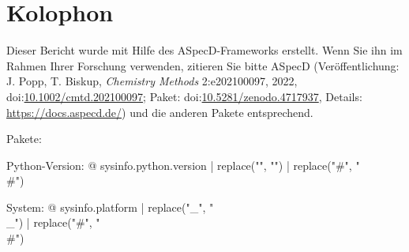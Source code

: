 \section*{Kolophon}

Dieser Bericht wurde mit Hilfe des ASpecD-Frameworks erstellt. Wenn Sie ihn im Rahmen Ihrer Forschung verwenden, zitieren Sie bitte ASpecD (Veröffentlichung: J. Popp, T. Biskup, \emph{Chemistry Methods} 2:e202100097, 2022, doi:\href{https://doi.org/10.1002/cmtd.202100097}{10.1002/cmtd.202100097}; Paket: doi:\href{https://doi.org/10.5281/zenodo.4717937}{10.5281/zenodo.4717937}, Details: \url{https://docs.aspecd.de/}) und die anderen Pakete entsprechend.

Pakete: %


Python-Version: {@ sysinfo.python.version | replace("\n", "") | replace("#", "\\#") }

System: {@ sysinfo.platform | replace("_", "\\_") | replace("#", "\\#") }
